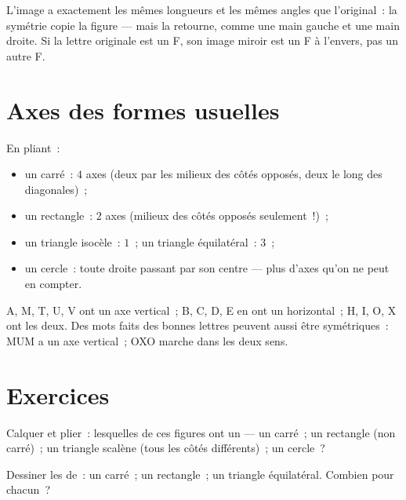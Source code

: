 \begin{example}\label{ex:g4:symmetry:properties}
L'image a exactement les mêmes longueurs et les mêmes angles que
l'original~: la symétrie copie la figure --- mais la retourne, comme
une main gauche et une main droite. Si la lettre originale est un F,
son image miroir est un F à l'envers, pas un autre F.
\end{example}

\section{Axes des formes usuelles}

\begin{example}\label{ex:g4:symmetry:shapes}
En pliant~:
\begin{itemize}
  \item un carré~: $4$ axes (deux par les milieux des côtés
        opposés, deux le long des diagonales)~;
  \item un rectangle~: $2$ axes (milieux des côtés opposés
        seulement~!)~;
  \item un triangle isocèle~: $1$~; un triangle équilatéral~: $3$~;
  \item un cercle~: toute droite passant par son centre --- plus
        d'axes qu'on ne peut en compter.
\end{itemize}
\end{example}

\begin{example}\label{ex:g4:symmetry:letters}
A, M, T, U, V ont un axe vertical~; B, C, D, E en ont un horizontal~;
H, I, O, X ont les deux. Des mots faits des bonnes lettres peuvent
aussi être symétriques~: MUM a un axe vertical~; OXO marche dans les
deux sens.
\end{example}

\section{Exercices}

\begin{exercise}[$\star$]\label{exo:g4:symmetry:1}
Calquer et plier~: lesquelles de ces figures ont un  --- un carré~; un rectangle (non carré)~; un triangle
scalène (tous les côtés différents)~; un cercle~?
\end{exercise}

\begin{exercise}[$\star$]\label{exo:g4:symmetry:2}
Dessiner les  de~: un carré~; un rectangle~; un
triangle équilatéral. Combien pour chacun~?
\end{exercise}

